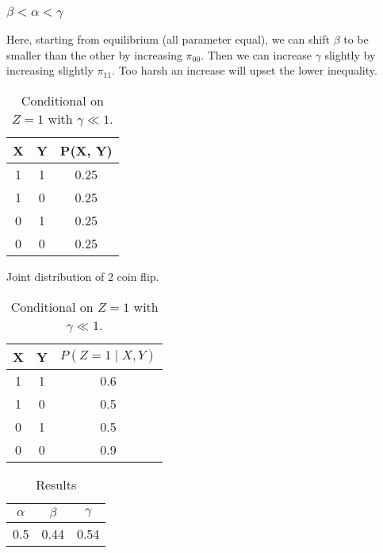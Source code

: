 \documentclass{article}
\numberwithin{equation}{section}
\theoremstyle{named}
\begin{document}
\subsubsection{$\beta < \alpha < \gamma$}
Here, starting from equilibrium (all parameter equal), we can shift $\beta$ to 
be smaller than the other by increasing $\pi_{00}$. Then we can increase 
$\gamma$ slightly by increasing slightly $\pi_{11}$. Too harsh an 
increase will upset the lower inequality.

\begin{table}[H]
\begin{minipage}{.45\textwidth}
        \centering
        
        \begin{tabular}{|c|c|c|}
                \hline
                X & Y & P(X, Y) \\  \hline
                1 & 1 & 0.25 \\\hline 
                1 & 0 & 0.25 \\\hline 
                0 & 1 & 0.25 \\\hline 
                0 & 0 & 0.25 \\\hline
        \end{tabular}
        \caption{Joint distribution of 2 coin flip.}
\end{minipage}
\begin{minipage}{.45\textwidth}
        \centering
        \begin{tabular}{|c|c|c|}
                \hline
                X & Y & $P(Z = 1 \mid X, Y)$ \\\hline
                1 & 1 & 0.6 \\\hline
                1 & 0 & 0.5 \\\hline
                0 & 1 & 0.5 \\\hline
                0 & 0 & 0.9 \\\hline
        \end{tabular}
        \caption{Conditional on $Z = 1$ with $\gamma \ll 1$.}
\end{minipage}
        \label{tab:Joint3}
\end{table}

\begin{table}[H]
        \centering
        \begin{tabular}{|c|c|c|}
                \hline 
                $\alpha$ & $\beta$ & $\gamma$ \\ \hline 
                0.5 & 0.44 & 0.54 \\\hline
        \end{tabular}
        \caption{Results}
        \label{tab:Res3}
\end{table}
\end{document}
